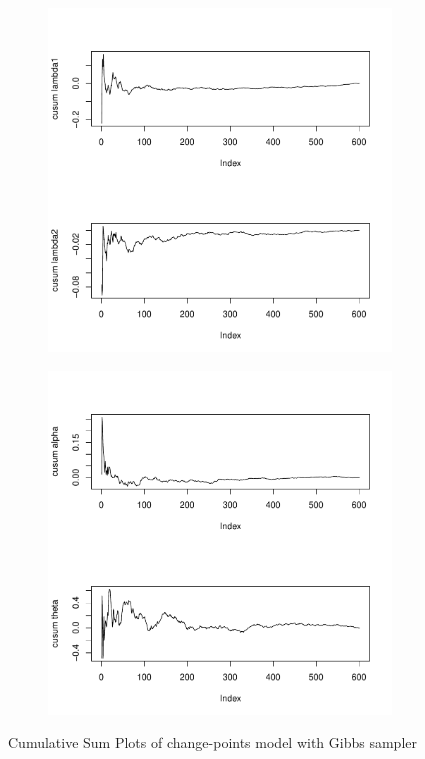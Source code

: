 \documentclass[11pt]{article}
\begin{document}
\begin{enumerate}
\begin{itemize}
\begin{figure}[!htbp]
\begin{subfigure}[t]{0.49\textwidth}
                \includegraphics[width=\linewidth]{img/gscs-1.pdf}
            \end{subfigure}
            \begin{subfigure}[t]{0.49\textwidth}
                \centering
                \includegraphics[width=\linewidth]{img/gscs-2.pdf}
            \end{subfigure}
            \caption{Cumulative Sum Plots of change-points model with Gibbs sampler}
            \label{fig:gscs}
        \end{figure}
        

\end{itemize}
\end{enumerate}
\end{document}

